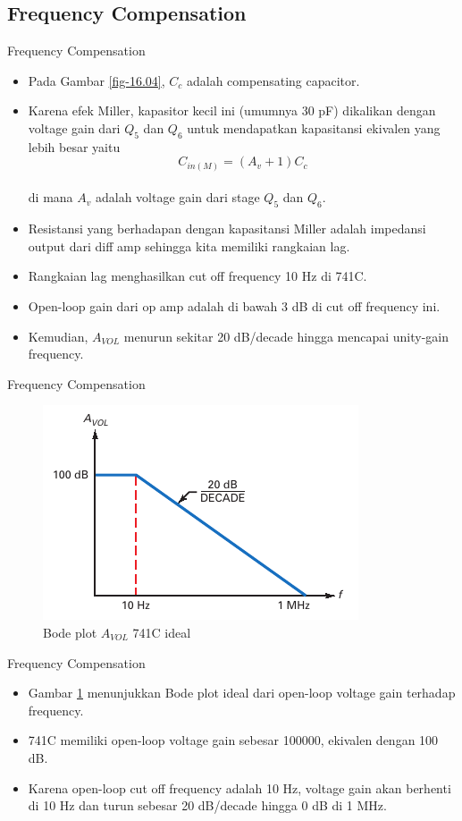 \subsection{Frequency Compensation}

\begin{frame}{Frequency Compensation}
	\begin{itemize}
		\item Pada Gambar \ref{fig-16.04}, $ C_c $ adalah compensating capacitor.
		\item Karena efek Miller, kapasitor kecil ini (umumnya 30 pF) dikalikan dengan voltage gain dari $ Q_5 $ dan $ Q_6 $ untuk mendapatkan kapasitansi ekivalen yang lebih besar yaitu\\
		$$ C_{in(M)} = (A_v + 1) C_c $$ \\
		di mana $ A_v $ adalah voltage gain dari stage $ Q_5 $ dan $ Q_6 $.
		\item Resistansi yang berhadapan dengan kapasitansi Miller adalah impedansi output dari diff amp sehingga kita memiliki rangkaian lag.
		\item Rangkaian lag menghasilkan cut off frequency 10 Hz di 741C.
		\item Open-loop gain dari op amp adalah di bawah 3 dB di cut off frequency ini.
		\item Kemudian, $ A_{VOL} $ menurun sekitar 20 dB/decade hingga mencapai unity-gain frequency.
	\end{itemize}
\end{frame}

\begin{frame}{Frequency Compensation}
	\begin{figure}
		\centering
		\includegraphics[width=0.5\linewidth]{gambar/fig-16.05}
		\caption{Bode plot $ A_{VOL} $ 741C ideal}
		\label{fig-16.05}
	\end{figure}
\end{frame}

\begin{frame}{Frequency Compensation}
	\begin{itemize}
		\item Gambar \ref{fig-16.05} menunjukkan Bode plot ideal dari open-loop voltage gain terhadap frequency.
		\item 741C memiliki open-loop voltage gain sebesar 100000, ekivalen dengan 100 dB.
		\item Karena open-loop cut off frequency adalah 10 Hz, voltage gain akan berhenti di 10 Hz dan turun sebesar 20 dB/decade hingga 0 dB di 1 MHz.
	\end{itemize}
\end{frame}

